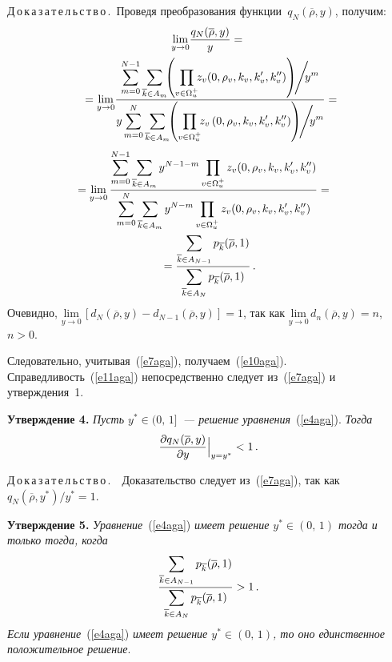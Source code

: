 \begin{multicols}{2}
\medskip

\noindent
Д\,о\,к\,а\,з\,а\,т\,е\,л\,ь\,с\,т\,в\,о\,.\ Проведя преобразования 
функции~$q_N(\overline{\rho},y)$, получим:
\begin{multline*}
\underset{y\rightarrow 0}{\mathrm{lim}}\fr{q_N(\overline{\rho},y)}{y} = {}\\
\!\!{}=
\underset{y\rightarrow 0}{\mathrm{lim}}
\fr{\sum\limits_{m=0}^{N-1}\sum\limits_{\overline{k}\in A_m}
\!\!\left (\prod\limits_{v\in\Omega_u^+}\!\! 
z_v(0,\rho_v,k_v,k_v^\prime , k_v^{\prime\prime})\right )\!\!\Bigg /\!\! y^m}
{y\sum\limits_{m=0}^{N}\sum\limits_{\overline{k}\in A_m}
\!\!\left(\prod\limits_{v\in\Omega_u^+}\!\! z_v\left (0,\rho_v,k_v,k_v^\prime , 
k_v^{\prime\prime}\right )\right )\!\!\Bigg /\!\!y^m} = \!\!\!
\end{multline*}
\begin{multline*}
\!\!\!\!\!\!{}=\underset{y\rightarrow 0}{\mathrm{lim}}\,
\displaystyle\frac{\displaystyle \sum\limits_{m=0}^{N-1}\sum\limits_{\overline{k}\in A_m}
y^{N-1-m}\prod\limits_{v\in\Omega_u^+} z_v(0,\rho_v,k_v,k_v^\prime , 
k_v^{\prime\prime})\mathstrut}{\displaystyle \sum\limits_{m=0}^{N}\sum\limits_{\overline{k}
\in A_m} y^{N-m}
\prod\limits_{v\in\Omega_u^+} z_v(0,\rho_v,k_v,k_v^\prime , 
k_v^{\prime\prime})\mathstrut}={}\!\\
{}=\displaystyle\frac{\displaystyle \sum\limits_{\overline{k}\in A_{N-1}} p_{\overline{k}}(\overline{\rho},1)\mathstrut}{\displaystyle  
\sum\limits_{\overline{k}\in A_{N}} p_{\overline{k}}(\overline{\rho},1)\mathstrut}\,.
\end{multline*}
Очевидно, $\underset{y\rightarrow 0}{\mathrm{lim}} \,[d_N (\overline{\rho},y) -
d_{N-1} (\overline{\rho},y)]=1$, так как $\underset{y\rightarrow 
0}{\mathrm{lim}}\,d_n (\overline{\rho},y)=n$, $n>0$.

Следовательно, учитывая~(\ref{e7aga}), получаем~(\ref{e10aga}). 
Справедливость~(\ref{e11aga}) непосредственно следует из~(\ref{e7aga}) и 
утверждения~1.

\medskip

\noindent
\textbf{Утверждение 4.} \textit{Пусть $y^*\in (0,\,1]$~--- решение 
уравнения}~(\ref{e4aga}). \textit{Тогда}
\begin{equation*}
\displaystyle\frac{\displaystyle \partial q_N(\overline{\rho},y)\mathstrut}{\displaystyle \partial y\mathstrut}\Big |_{y=y^*}<1\,.
\end{equation*}

\medskip

\noindent
Д\,о\,к\,а\,з\,а\,т\,е\,л\,ь\,с\,т\,в\,о\,.\ \ Доказательство следует из~(\ref{e7aga}), 
так как $q_N(\overline{\rho},y^*)/y^* =1$.
\medskip

\noindent
\textbf{Утверждение 5.} \textit{Уравнение}~(\ref{e4aga}) \textit{имеет решение $y^*\in 
(0,\,1)$ тогда и только тогда, когда} 
\begin{equation}
\displaystyle\frac{\displaystyle \sum\limits_{\overline{k}\in A_{N-1}} p_{\overline{k}}(\overline{\rho},1)\mathstrut}{\displaystyle  
\sum\limits_{\overline{k}\in A_{N}} p_{\overline{k}}(\overline{\rho},1)\mathstrut} >1\,.
\label{e13aga}
\end{equation}
\textit{Если уравнение}~(\ref{e4aga}) \textit{имеет решение $y^*\in (0,\,1)$, то оно 
единственное положительное решение}.
\medskip


\end{multicols}
